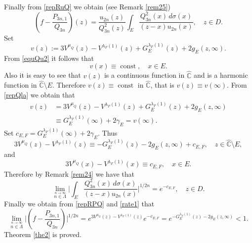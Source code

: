 \documentclass[11pt, a4paper, twoside]{article}
\def\({\left(}
\def\){\right)}
\let\myh\widehat
\def\CC{\mathbb C}
\def\const{\operatorname{const}}
\theoremstyle{plain}
\theoremstyle{definition}
\begin{document}
Finally from \eqref{repRuQ} we obtain (see Remark \ref{rem25})
\begin{equation}
\(f-\frac{P_{3n,1}}{Q_{3n}}\)(z)=\frac{u_{2n}(z)}{Q^2_{3n}(z)}
\int_E\frac{Q^2_{3n}(x)\,d\sigma(x)}{(z-x)u_{2n}(x)},
\quad z\in D.
\label{repRPQ}
\end{equation}
Set
\begin{equation}
v(z):=3V^{\mu_Q}(z)-V^{\lambda_F(1)}(z)+G_E^{\lambda_F(1)}(z)+2g_E(z,\infty).
\label{repQla}
\end{equation}
From \eqref{equQu2} it follows that
$$
v(x)\equiv\const,\quad x\in E.
$$
Also it is easy to see that $v(z)$ is a continuous function in $\myh{\CC}$ and is a harmonic function in $\myh{\CC}\setminus E$.
Therefore $v(z)\equiv\const$ in $\myh{\CC}$, that is $v(z) \equiv v(\infty)$. From \eqref{repQla} we obtain that
\begin{align}
v(z)&=3V^{\mu_Q}(z)-V^{\lambda_F(1)}(z)+G_E^{\lambda_F(1)}(z)+2g_E(z,\infty)\nonumber\\
&\equiv G_E^{\lambda_F(1)}(\infty)+2\gamma_E=v(\infty).
\label{repQlab}
\end{align}
Set $c_{E,F} = G_E^{\lambda_F(1)}(\infty)+2\gamma_E$. Thus
\begin{equation}
3V^{\mu_Q}(z)-V^{\lambda_F(1)}(z)\equiv -G_E^{\lambda_F(1)}(z)-2g_E(z,\infty)+c_{E,F}, 
\quad z\in\myh{\CC}\setminus E,
\label{rate1}
\end{equation}
and
\begin{equation}
3V^{\mu_Q}(x)-V^{\lambda_F(1)}(x)\equiv c_{E,F},
\quad 
x\in E.
\label{rate2}
\end{equation}
Therefore by Remark \ref{rem24} we have that
\begin{equation}
\lim_{\stackrel{n\to\infty}{n\in\Lambda}}\biggl|
\int_E\frac{Q^2_{3n}(x)\,d\sigma(x)}{(z-x)u_{2n}(x)}
\biggr|^{1/2n}=e^{-c_{E,F}},
\quad z\in D.
\label{rate3}
\end{equation}
Finally we obtain from \eqref{repRPQ} and \eqref{rate1} that
$$
\lim_{\stackrel{n\to\infty}{n\in\Lambda}}\biggl|
\(f-\frac{P_{3n,1}}{Q_{3n}}\)\biggr|^{1/2n}
=e^{3V^{\mu_Q}(z)-V^{\lambda_F(1)}(z)}e^{-c_{E,F}}
=e^{-G_E^{\lambda_F(1)}(z)-2g_E(z,\infty)}<1.
$$
Theorem \ref{the2} is proved.
\end{document}
